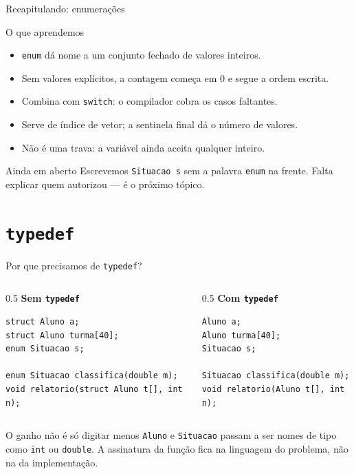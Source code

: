 \documentclass[aspectratio=169]{beamer}
\begin{document}
\begin{frame}{Recapitulando: enumerações}
  \begin{block}{O que aprendemos}
    \begin{itemize}
      \item \texttt{enum} dá nome a um conjunto fechado de valores inteiros.
      \item Sem valores explícitos, a contagem começa em 0 e segue a ordem escrita.
      \item Combina com \texttt{switch}: o compilador cobra os casos faltantes.
      \item Serve de índice de vetor; a sentinela final dá o número de valores.
      \item Não é uma trava: a variável ainda aceita qualquer inteiro.
    \end{itemize}
  \end{block}
  \begin{exampleblock}{Ainda em aberto}
    Escrevemos \texttt{Situacao s} sem a palavra \texttt{enum} na frente. Falta
    explicar quem autorizou --- é o próximo tópico.
  \end{exampleblock}
\end{frame}

\section{\texttt{typedef}}

\begin{frame}[fragile]{Por que precisamos de \texttt{typedef}?}
\begin{columns}[T]
\begin{column}{0.5\textwidth}
\textbf{Sem \texttt{typedef}}
\begin{lstlisting}[basicstyle=\ttfamily\scriptsize]
struct Aluno a;
struct Aluno turma[40];
enum Situacao s;

enum Situacao classifica(double m);
void relatorio(struct Aluno t[], int n);
\end{lstlisting}
\end{column}
\begin{column}{0.5\textwidth}
\textbf{Com \texttt{typedef}}
\begin{lstlisting}[basicstyle=\ttfamily\scriptsize]
Aluno a;
Aluno turma[40];
Situacao s;

Situacao classifica(double m);
void relatorio(Aluno t[], int n);
\end{lstlisting}
\end{column}
\end{columns}
  \begin{block}{O ganho não é só digitar menos}
    \texttt{Aluno} e \texttt{Situacao} passam a ser nomes de tipo como
    \texttt{int} ou \texttt{double}. A assinatura da função fica na linguagem do
    problema, não na da implementação.
  \end{block}
\end{frame}
\end{document}

